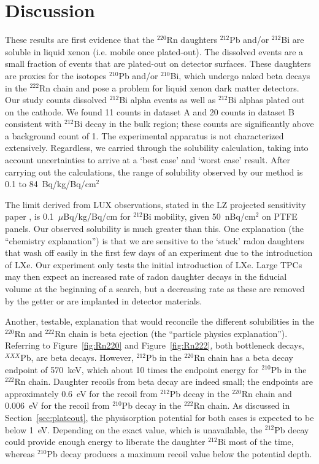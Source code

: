 \section{Discussion}
These results are first evidence that the $^{220}$Rn daughters $^{212}$Pb and/or $^{212}$Bi are soluble in liquid xenon (i.e. mobile once plated-out). The dissolved events are a small fraction of events that are plated-out on detector surfaces. These daughters are proxies for the isotopes $^{210}$Pb and/or $^{210}$Bi, which undergo naked beta decays in the $^{222}$Rn chain and pose a problem for liquid xenon dark matter detectors. Our study counts dissolved $^{212}$Bi alpha events as well as $^{212}$Bi alphas plated out on the cathode. We found 11 counts in dataset A and 20 counts in dataset B consistent with $^{212}$Bi decay in the bulk region; these counts are significantly above a background count of 1. The experimental apparatus is not characterized extensively. Regardless, we carried through the solubility calculation, taking into account uncertainties to arrive at a `best case' and `worst case' result. After carrying out the calculations, the range of solubility observed by our method is 0.1 to 84~Bq/kg/Bq/cm$^{2}$

The limit derived from \ac{LUX} observations, stated in the \ac{LZ} projected sensitivity paper \cite{LZ:Sensitivity}, is 0.1~$\mu$Bq/kg/Bq/cm for $^{212}$Bi mobility, given 50~nBq/cm$^{2}$ on \ac{PTFE} panels. Our observed solubility is much greater than this. One explanation (the ``chemistry explanation'')  is that we are sensitive to the `stuck' radon daughters that wash off easily in the first few days of an experiment due to the introduction of \ac{LXe}. Our experiment only tests the initial introduction of \ac{LXe}. Large \ac{TPC}s may then expect an increased rate of radon daughter decays in the fiducial volume at the beginning of a search, but a decreasing rate as these are removed by the getter or are implanted in detector materials. 

Another, testable, explanation that would reconcile the different solubilities in the $^{220}$Rn and $^{222}$Rn chain is beta ejection (the ``particle physics explanation''). Referring to Figure~\ref{fig:Rn220} and Figure~\ref{fig:Rn222}, both bottleneck decays, $^{XXX}$Pb, are beta decays. However, $^{212}$Pb in the $^{220}$Rn chain has a beta decay endpoint of 570~keV, which about 10 times the endpoint energy for $^{210}$Pb in the $^{222}$Rn chain. Daughter recoils from beta decay are indeed small; the endpoints are approximately 0.6~eV for the recoil from $^{212}$Pb decay in the $^{220}$Rn chain and  0.006~eV for the recoil from $^{210}$Pb decay in the $^{222}$Rn chain. As discussed in Section~\ref{sec:plateout}, the physisorption potential for both cases is expected to be below 1~eV. Depending on the exact value, which is unavailable, the $^{212}$Pb decay could provide enough energy to liberate the daughter $^{212}$Bi most of the time, whereas $^{210}$Pb decay produces a maximum recoil value below the potential depth. 

